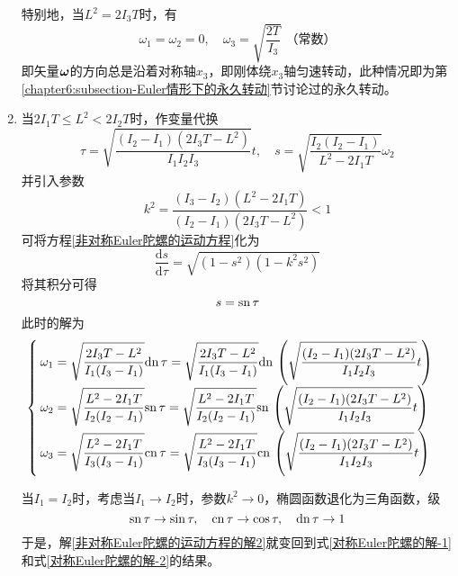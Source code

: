 \begin{enumerate}
特别地，当$L^2=2I_3T$时，有
\begin{equation*}
	\omega_1 = \omega_2 = 0,\quad \omega_3 = \sqrt{\frac{2T}{I_3}}\,\,\text{（常数）}
\end{equation*}
即矢量$\boldsymbol{\omega}$的方向总是沿着对称轴$x_3$，即刚体绕$x_3$轴匀速转动，此种情况即为第\ref{chapter6:subsection-Euler情形下的永久转动}节讨论过的永久转动。

\item 当$2I_1T\leqslant L^2<2I_2T$时，作变量代换
\begin{equation}
	\tau = \sqrt{\frac{(I_2-I_1)(2I_3T-L^2)}{I_1I_2I_3}}t,\quad s = \sqrt{\frac{I_2(I_2-I_1)}{L^2-2I_1T}}\omega_2
\end{equation}
并引入参数
\begin{equation}
	k^2 = \frac{(I_3-I_2)(L^2-2I_1T)}{(I_2-I_1)(2I_3T-L^2)}<1
\end{equation}
可将方程\eqref{非对称Euler陀螺的运动方程}化为
\begin{equation*}
	\frac{\mathrm{d}s}{\mathrm{d}\tau} = \sqrt{(1-s^2)(1-k^2s^2)}
\end{equation*}
将其积分可得
\begin{equation*}
	s = \mathrm{sn}\, \tau
\end{equation*}
此时的解为
\begin{equation}
\begin{cases}
	\displaystyle \omega_1 = \sqrt{\frac{2I_3T-L^2}{I_1(I_3-I_1)}}\mathrm{dn}\, \tau = \sqrt{\frac{2I_3T-L^2}{I_1(I_3-I_1)}}\mathrm{dn}\, \left(\sqrt{\frac{(I_2-I_1)(2I_3T-L^2)}{I_1I_2I_3}}t\right) \\
	\displaystyle \omega_2 = \sqrt{\frac{L^2-2I_1T}{I_2(I_2-I_1)}}\mathrm{sn}\, \tau = \sqrt{\frac{L^2-2I_1T}{I_2(I_2-I_1)}}\mathrm{sn}\, \left(\sqrt{\frac{(I_2-I_1)(2I_3T-L^2)}{I_1I_2I_3}}t\right) \\
	\displaystyle \omega_3 = \sqrt{\frac{L^2-2I_1T}{I_3(I_3-I_1)}}\mathrm{cn}\, \tau = \sqrt{\frac{L^2-2I_1T}{I_3(I_3-I_1)}}\mathrm{cn}\, \left(\sqrt{\frac{(I_2-I_1)(2I_3T-L^2)}{I_1I_2I_3}}t\right)
\end{cases}
\label{非对称Euler陀螺的运动方程的解3}
\end{equation}

当$I_1=I_2$时，考虑当$I_1\to I_2$时，参数$k^2\to 0$，椭圆函数退化为三角函数，级
\begin{equation*}
	\mathrm{sn}\, \tau \to \sin \tau,\quad \mathrm{cn}\,\tau \to \cos \tau,\quad \mathrm{dn}\, \tau \to 1
\end{equation*}
于是，解\eqref{非对称Euler陀螺的运动方程的解2}就变回到式\eqref{对称Euler陀螺的解-1}和式\eqref{对称Euler陀螺的解-2}的结果。


\end{enumerate}

